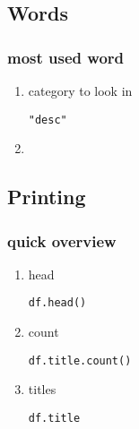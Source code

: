 \documentclass[11pt]{article}
\begin{document}
\subsection{Words}
\label{sec:orge3c7301}
\subsubsection{most used word}
\label{sec:orgdc9d578}
\begin{enumerate}
\item category to look in
\label{sec:org4401ae7}
\begin{verbatim}
"desc"
\end{verbatim}

\item 
\label{sec:org3bc245e}
\end{enumerate}
\subsection{Printing}
\label{sec:org52be9dc}
\subsubsection{quick overview}
\label{sec:org4fc5910}
\begin{enumerate}
\item head
\label{sec:orgc764aa3}
\begin{verbatim}
df.head()
\end{verbatim}

\item count
\label{sec:org052cbd5}
\begin{verbatim}
df.title.count()
\end{verbatim}
\item titles
\label{sec:orgcec092b}
\begin{verbatim}
df.title
\end{verbatim}
\end{enumerate}
\end{document}

